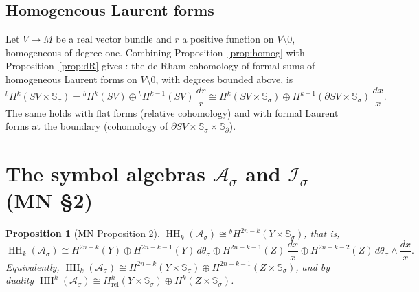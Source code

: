 \documentclass[11pt,oneside,reqno]{article}
\DeclareMathOperator{\HH}{HH}
\newcommand{\Is}{\mathcal I_\sigma}
\newcommand{\As}{\mathcal A_\sigma}
\newcommand{\Ssig}{\mathbb S_\sigma}
\newcommand{\Sd}{\mathbb S_\partial}
\newcommand{\Hrel}{H_{\mathrm{rel}}}
\theoremstyle{plain}
\newtheorem{proposition}[theorem]{Proposition}
\theoremstyle{definition}
\theoremstyle{remark}
\begin{document}
\subsection{Homogeneous Laurent forms}
Let \(V\to M\) be a real vector bundle and \(r\) a positive function on
\(V\setminus0\), homogeneous of degree one. Combining
Proposition~\ref{prop:homog} with Proposition~\ref{prop:dR} gives
\cite[(35)]{MN}: the de Rham cohomology of formal sums of homogeneous
Laurent forms on \(V\setminus0\), with degrees bounded above, is
\begin{equation}\label{eq:bH}
 {}^bH^k(SV\times\Ssig)={}^bH^k(SV)\oplus{}^bH^{k-1}(SV)\,\frac{dr}r
 \cong H^k(SV\times\Ssig)\oplus H^{k-1}(\partial SV\times\Ssig)\,\frac{dx}x .
\end{equation}
The same holds with flat forms (relative cohomology) and with formal Laurent
forms at the boundary (cohomology of \(\partial SV\times\Ssig\times\Sd\)).

\section{The symbol algebras \texorpdfstring{\(\As\)}{As} and \texorpdfstring{\(\Is\)}{Is} (MN \S2)}\label{sec:symbols}

\begin{proposition}[MN Proposition 2]\label{prop:As}
\(\HH_k(\As)\cong{}^bH^{2n-k}(Y\times\Ssig)\), that is,
\[
 \HH_k(\As)\cong H^{2n-k}(Y)\oplus H^{2n-k-1}(Y)\,d\theta_\sigma\oplus
 H^{2n-k-1}(Z)\,\frac{dx}x\oplus H^{2n-k-2}(Z)\,d\theta_\sigma\wedge
 \frac{dx}x .
\]
Equivalently, \(\HH_k(\As)\cong H^{2n-k}(Y\times\Ssig)\oplus
H^{2n-k-1}(Z\times\Ssig)\), and by duality
\(\HH^k(\As)\cong\Hrel^k(Y\times\Ssig)\oplus H^k(Z\times\Ssig)\).
\end{proposition}
\end{document}
